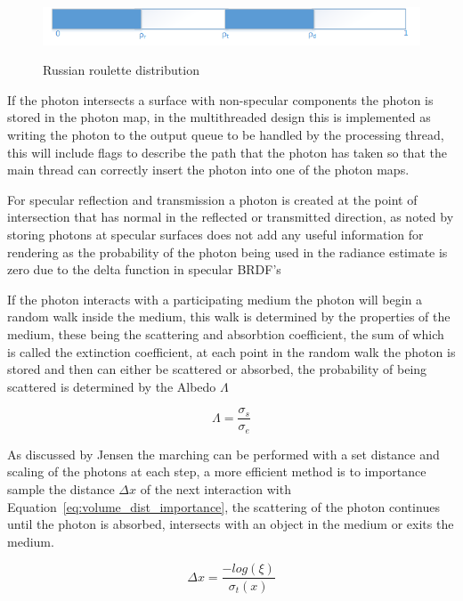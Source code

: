 \begin{figure}
\includegraphics{./images/russian_roulette_distribution.png}
\label{fig:rr_dist}
\caption{Russian roulette distribution}
\end{figure}

If the photon intersects a surface with non-specular components the photon is stored in the photon map, in the multithreaded
design this is implemented as writing the photon to the output queue to be handled by the processing thread, this will include
flags to describe the path that the photon has taken so that the main thread can correctly insert the photon into one of the
photon maps.

For specular reflection and transmission a photon is created at the point of intersection that has normal in the reflected
or transmitted direction, as noted by  storing photons at specular surfaces does not add any useful
information for rendering as the probability of the photon being used in the radiance estimate is zero due to the
delta function in specular BRDF's

If the photon interacts with a participating medium the photon will begin a random walk inside the medium, this walk
is determined by the properties of the medium, these being the scattering and absorbtion coefficient, the sum of which
is called the extinction coefficient, at each point in the random walk the photon is stored and then can either be
scattered or absorbed, the probability of being scattered is determined by the Albedo $\Lambda$


\begin{equation}
\Lambda = \frac{\sigma_s}{\sigma_e}
\end{equation}

As discussed by Jensen  the marching can be performed with a set distance and scaling of the photons at each
step, a more efficient method is to importance sample the distance $\Delta x$ of the next interaction with 
Equation~\ref{eq:volume_dist_importance}, the scattering of the photon continues until the photon is absorbed, intersects
with an object in the medium or exits the medium.

\begin{equation}
\Delta x = \frac{-log(\xi)}{\sigma_t(x)}
\label{eq:volum_dist_importance}
\end{equation}

